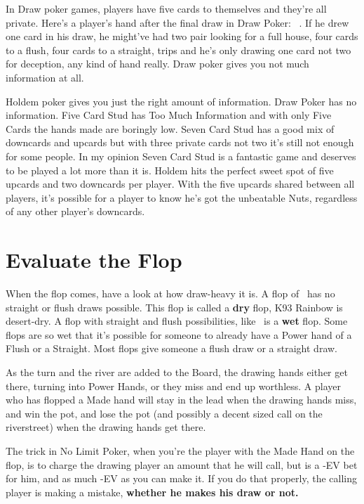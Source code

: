 In Draw poker games, players have five cards to themselves and they're
all private. Here's a player's hand after the final draw in Draw
Poker: \back\back\back\back\back\ . If he drew one card in his draw,
he might've had two pair looking for a full house, four cards to a
flush, four cards to a straight, trips and he's only drawing one card
not two for deception, any kind of hand really. Draw poker gives you
not much information at all.

Holdem poker gives you just the right amount of information. Draw
Poker has no information. Five Card Stud has Too Much Information and
with only Five Cards the hands made are boringly low. Seven Card Stud
has a good mix of downcards and upcards but with three private cards
not two it's still not enough for some people. In my opinion Seven
Card Stud is a fantastic game and deserves to be played a lot more
than it is. Holdem hits the perfect sweet spot of five upcards and two
downcards per player. With the five upcards shared between all
players, it's possible for a player to know he's got the unbeatable
Nuts, regardless of any other player's downcards.

\section{Evaluate the Flop}

When the flop comes, have a look at how draw-heavy it is. A flop of
\Ks\nineh\trec\ has no straight or flush draws possible. This flop is
called a \textbf{dry} flop, K93 Rainbow is desert-dry. A flop with
straight and flush possibilities, like \Td\nined\sixh\ is a
\textbf{wet} flop. Some flops are so wet that it's possible for
someone to already have a Power hand of a Flush or a Straight. Most
flops give someone a flush draw or a straight draw.

As the turn and the river are added to the Board, the drawing hands
either get there, turning into Power Hands, or they miss and end up
worthless. A player who has flopped a Made hand will stay in the lead
when the drawing hands miss, and win the pot, and lose the pot (and
possibly a decent sized call on the riverstreet) when the
drawing hands get there.

The trick in No Limit Poker, when you're the player with the Made Hand
on the flop, is to charge the drawing player an amount that he will
call, but is a -EV bet for him, and as much -EV as you can make it. If
you do that properly, the calling player is making a mistake,
\textbf{whether he makes his draw or not.}

